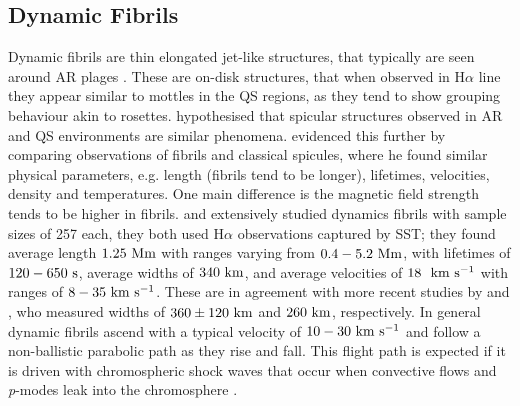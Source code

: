\subsection{Dynamic Fibrils}
\label{subsec:dfibs}
Dynamic fibrils are thin elongated jet-like structures, that typically are seen around AR plages \citep{Hansteen2006ApJ,De_Pontieu2007ApJ}. These are on-disk structures, that when observed in H$\alpha$ line they appear similar to mottles in the QS regions, as they tend to show grouping behaviour akin to rosettes. \cite{Foukal1971SoPh20298F} hypothesised that spicular structures observed in AR and QS environments are similar phenomena. \citep{Foukal1971SoPh1959F} evidenced this further by comparing observations of fibrils and classical spicules, where he found similar physical parameters, e.g. length (fibrils tend to be longer), lifetimes, velocities, density and temperatures. One main difference is the magnetic field strength tends to be higher in fibrils. \cite{Hansteen2006ApJ} and \cite{De_Pontieu2007ApJ} extensively studied dynamics fibrils with sample sizes of 257 each, they both used H$\alpha$ observations captured by SST; they found average length $1.25~\rm{Mm}$ with ranges varying from $0.4-5.2~\rm{Mm}$, with lifetimes of $120-650~\rm{s}$, average widths of $340~\rm{km}$, and average velocities of $18~~\rm{km ~s^{-1}}$ with ranges of $8-35~\rm{km ~s^{-1}}$. These are in agreement with more recent studies by \cite{Morton2012NatCo31315M} and \cite{Gafeira2017ApJS2297G}, who measured widths of $360\pm120~\rm{km}$ and $260~\rm{km}$, respectively. In general dynamic fibrils ascend with a typical velocity of $10-30~\rm{km ~s^{-1}}$ and follow a non-ballistic parabolic path as they rise and fall. This flight path is expected if it is driven with chromospheric shock waves that occur when convective flows and \textit{p}-modes leak into the chromosphere \citep{Hansteen2006ApJ,De_Pontieu2007ApJ,Langangen2008ApJ6731194L}. \np
%

